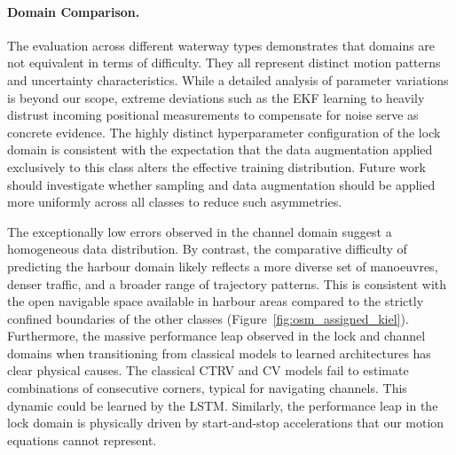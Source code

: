 \paragraph{Domain Comparison.} %
The evaluation across different waterway types demonstrates that domains are not equivalent in terms of difficulty.
They all represent distinct motion patterns and uncertainty characteristics.
While a detailed analysis of parameter variations is beyond our scope, extreme deviations such as the \ac{EKF} learning to heavily distrust incoming positional measurements to compensate for noise serve as concrete evidence. %
The highly distinct hyperparameter configuration of the lock domain is consistent with the expectation that the data augmentation applied exclusively to this class alters the effective training distribution. 
Future work should investigate whether sampling and data augmentation should be applied more uniformly across all classes to reduce such asymmetries. %

The exceptionally low errors observed in the channel domain suggest a homogeneous data distribution.
By contrast, the comparative difficulty of predicting the harbour domain likely reflects a more diverse set of manoeuvres, denser traffic, and a broader range of trajectory patterns.
This is consistent with the open navigable space available in harbour areas compared to the strictly confined boundaries of the other classes (Figure~\ref{fig:osm_assigned_kiel}).
Furthermore, the massive performance leap observed in the lock and channel domains when transitioning from classical models to learned architectures has clear physical causes.
The classical \ac{CTRV} and \ac{CV} models fail to estimate combinations of consecutive corners, typical for navigating channels. This dynamic could be learned by the \ac{LSTM}.
Similarly, the performance leap in the lock domain is physically driven by start-and-stop accelerations that our motion equations cannot represent.



